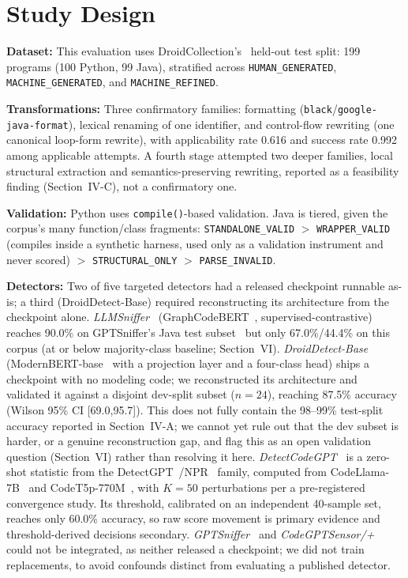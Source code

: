 \documentclass[10pt,conference]{IEEEtran}
\begin{document}
\section{Study Design}

\textbf{Dataset:} This evaluation uses DroidCollection's~\cite{droid} held-out test split: 199 programs (100 Python, 99 Java), stratified across \texttt{HUMAN\_GENERATED}, \texttt{MACHINE\_GENERATED}, and \texttt{MACHINE\_REFINED}.

\textbf{Transformations:} Three confirmatory families: formatting (\texttt{black}/\texttt{google-java-format}), lexical renaming of one identifier, and control-flow rewriting (one canonical loop-form rewrite), with applicability rate 0.616 and success rate 0.992 among applicable attempts. A fourth stage attempted two deeper families, local structural extraction and semantics-preserving rewriting, reported as a feasibility finding (Section~IV-C), not a confirmatory one.

\textbf{Validation:} Python uses \texttt{compile()}-based validation. Java is tiered, given the corpus's many function/class fragments: \texttt{STANDALONE\_VALID} $>$ \texttt{WRAPPER\_VALID} (compiles inside a synthetic harness, used only as a validation instrument and never scored) $>$ \texttt{STRUCTURAL\_ONLY} $>$ \texttt{PARSE\_INVALID}.

\textbf{Detectors:} Two of five targeted detectors had a released checkpoint runnable as-is; a third (DroidDetect-Base) required reconstructing its architecture from the checkpoint alone. \emph{LLMSniffer}~\cite{llmsniffer} (GraphCodeBERT~\cite{graphcodebert}, supervised-contrastive) reaches 90.0\% on GPTSniffer's Java test subset~\cite{gptsniffer} but only 67.0\%/44.4\% on this corpus (at or below majority-class baseline; Section~VI). \emph{DroidDetect-Base} (ModernBERT-base~\cite{modernbert} with a projection layer and a four-class head) ships a checkpoint with no modeling code; we reconstructed its architecture and validated it against a disjoint dev-split subset ($n{=}24$), reaching 87.5\% accuracy (Wilson 95\% CI [69.0,95.7]). This does not fully contain the 98--99\% test-split accuracy reported in Section~IV-A; we cannot yet rule out that the dev subset is harder, or a genuine reconstruction gap, and flag this as an open validation question (Section~VI) rather than resolving it here. \emph{DetectCodeGPT}~\cite{detectcodegpt} is a zero-shot statistic from the DetectGPT~\cite{detectgpt}/NPR~\cite{detectllm} family, computed from CodeLlama-7B~\cite{codellama} and CodeT5p-770M~\cite{codet5plus}, with $K{=}50$ perturbations per a pre-registered convergence study. Its threshold, calibrated on an independent 40-sample set, reaches only 60.0\% accuracy, so raw score movement is primary evidence and threshold-derived decisions secondary. \emph{GPTSniffer}~\cite{gptsniffer} and \emph{CodeGPTSensor/+}~\cite{codegptsensor} could not be integrated, as neither released a checkpoint; we did not train replacements, to avoid confounds distinct from evaluating a published detector.
\end{document}
